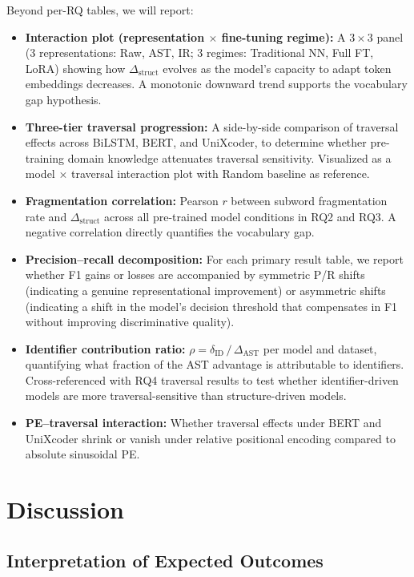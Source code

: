 \documentclass[pdflatex,sn-mathphys,Numbered]{sn-jnl}
\begin{document}
Beyond per-RQ tables, we will report:
\begin{itemize}
\item \textbf{Interaction plot (representation $\times$ fine-tuning regime):} A $3 \times 3$ panel (3 representations: Raw, AST, IR; 3 regimes: Traditional NN, Full FT, LoRA) showing how $\Delta_{\text{struct}}$ evolves as the model's capacity to adapt token embeddings decreases. A monotonic downward trend supports the vocabulary gap hypothesis.
\item \textbf{Three-tier traversal progression:} A side-by-side comparison of traversal effects across BiLSTM, BERT, and UniXcoder, to determine whether pre-training domain knowledge attenuates traversal sensitivity. Visualized as a model $\times$ traversal interaction plot with Random baseline as reference.
\item \textbf{Fragmentation correlation:} Pearson $r$ between subword fragmentation rate and $\Delta_{\text{struct}}$ across all pre-trained model conditions in RQ2 and RQ3. A negative correlation directly quantifies the vocabulary gap.
\item \textbf{Precision--recall decomposition:} For each primary result table, we report whether F1 gains or losses are accompanied by symmetric P/R shifts (indicating a genuine representational improvement) or asymmetric shifts (indicating a shift in the model's decision threshold that compensates in F1 without improving discriminative quality).
\item \textbf{Identifier contribution ratio:} $\rho = \delta_{\text{ID}} \,/\, \Delta_{\text{AST}}$ per model and dataset, quantifying what fraction of the AST advantage is attributable to identifiers. Cross-referenced with RQ4 traversal results to test whether identifier-driven models are more traversal-sensitive than structure-driven models.
\item \textbf{PE--traversal interaction:} Whether traversal effects under BERT and UniXcoder shrink or vanish under relative positional encoding compared to absolute sinusoidal PE.
\end{itemize}

\section{Discussion}\label{sec:discussion}

\subsection{Interpretation of Expected Outcomes}
\end{document}
